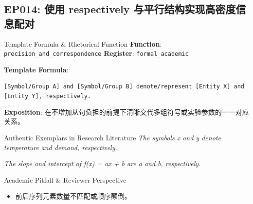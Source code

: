 \subsection{EP014: 使用 respectively 与平行结构实现高密度信息配对}\label{sec:ep:EP014}
\begin{ConceptBox}{Template Formula \& Rhetorical Function}
\textbf{Function}: \texttt{precision\_and\_correspondence} \quad \textbf{Register}: \texttt{formal\_academic}\par\vspace{3pt}
\textbf{Template Formula}:\par\noindent\texttt{[Symbol/Group A] and [Symbol/Group B] denote/represent [Entity X] and [Entity Y], respectively.}\par\vspace{4pt}
\textbf{Exposition}: 在不增加从句负担的前提下清晰交代多组符号或实验参数的一一对应关系。
\end{ConceptBox}
\begin{ExampleBox}{Authentic Exemplars in Research Literature}
\textit{The symbols x and y denote temperature and demand, respectively.}\par\vspace{2pt}
\textit{The slope and intercept of f(x) = ax + b are a and b, respectively.}\par\vspace{2pt}
\end{ExampleBox}
\begin{TipBox}{Academic Pitfall \& Reviewer Perspective}
\begin{itemize}[leftmargin=1.5em, itemsep=1pt]
  \item 前后序列元素数量不匹配或顺序颠倒。
\end{itemize}
\end{TipBox}
\vspace{6pt}

